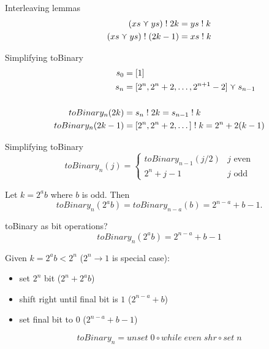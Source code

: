\documentclass[xcolor={usenames,dvipsnames,svgnames,table},12pt]{beamer}
\newenvironment{xframe}[1][]
  {\begin{frame}[fragile,environment=xframe,#1]}
  {\end{frame}}
\newcommand{\toB}{\mathit{toBinary}}
\newcommand{\set}[1]{\mathit{set}\;{#1}}
\newcommand{\unset}[1]{\mathit{unset}\;{#1}}
\newcommand{\while}[2]{\mathit{while}\;{#1}\;{#2}}
\newcommand{\even}{\mathit{even}}
\newcommand{\shr}{\mathit{shr}}
\begin{document}
\begin{xframe}{Interleaving lemmas}
  \begin{align*}
    (xs \merge ys)\; ! \; 2k &= ys\;!\;k \\
    (xs \merge ys)\; ! \; (2k - 1) &= xs\;!\;k
  \end{align*}
\end{xframe}

\begin{xframe}{Simplifying toBinary}
  \begin{align*}
    s_0 &= [1] \\
    s_n &= [2^n, 2^n + 2, \dots, 2^{n+1}-2] \merge s_{n-1} \\ \\
    toBinary_n(2k)   &= s_n\;!\;2k = s_{n-1}\;!\;k \\
    toBinary_n(2k-1) &= [2^n, 2^n + 2, \dots]\;!\; k = 2^n + 2(k-1)
  \end{align*}
  \onslide<2->{
    \[ \toB_n(j) = \begin{cases}
        \toB_{n-1}(j/2) & \text{$j$ even} \\ 2^n + j - 1
        & \text{$j$ odd} \end{cases} \]
  } \bigskip
\end{xframe}

\begin{xframe}{Simplifying toBinary}
    \[ \toB_n(j) = \begin{cases}
        \toB_{n-1}(j/2) & \text{$j$ even} \\ 2^n + j - 1
        & \text{$j$ odd} \end{cases} \] \bigskip

  Let $k = 2^a b$ where $b$ is odd.  Then
  \[ \toB_n(2^a b) = \toB_{n-a}(b) =
    2^{n-a} + b - 1. \]
\end{xframe}

\begin{xframe}{toBinary as bit operations?}
  \[ \toB_n(2^a b) = 2^{n-a} + b - 1 \]

  Given $k = 2^a b < 2^n$ ($2^n \to 1$ is special case):
  \begin{itemize}
  \item set $2^n$ bit ($2^n + 2^a b$)
  \item shift right until final bit is $1$  ($2^{n-a} + b$)
  \item set final bit to $0$ ($2^{n-a} + b - 1$)
  \end{itemize} \medskip

  \[ \toB_n = \unset 0 \circ \while{\even}{\shr} \circ
    \set{n} \]


\end{xframe}
\end{document}
